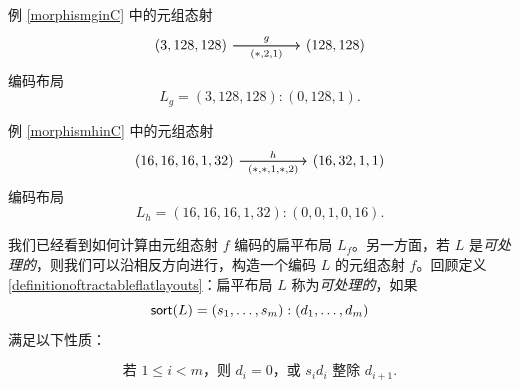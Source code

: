 \begin{example} 例 \ref{morphismginC} 中的元组态射
\[\begin{tikzcd}
(3,128,128) \ar[rr,"g"] \ar[rr,swap,"(*{,}2{,}1)"] & &  (128,128)
\end{tikzcd} \]
编码布局
\[
L_g = (3,128,128):(0,128,1).
\]
\end{example}

\begin{example} 例 \ref{morphismhinC} 中的元组态射
    \[ \begin{tikzcd}
    (16,16,16,1,32) \ar[rr,"h"] \ar[rr,swap,"(*{,}*{,}1{,}*{,}2)"] & &  (16,32,1,1)
    \end{tikzcd} \]
编码布局
\[
L_h = (16,16,16,1,32):(0,0,1,0,16).
\]
\end{example}

我们已经看到如何计算由元组态射 $f$ 编码的扁平布局 $L_f$。另一方面，若 $L$ 是{\it 可处理的}，则我们可以沿相反方向进行，构造一个编码 $L$ 的元组态射 $f$。回顾定义 \ref{definitionoftractableflatlayouts}：扁平布局 $L$ 称为{\it 可处理的}，如果
\[\mathsf{sort}(L) = (s_1,\dots,s_m):(d_1,\dots,d_m)\]
满足以下性质：

\[ \text{若 }1 \leq i < m\text{，则 }d_i = 0\text{，或 }s_id_i \text{ 整除 }d_{i+1}. \]

